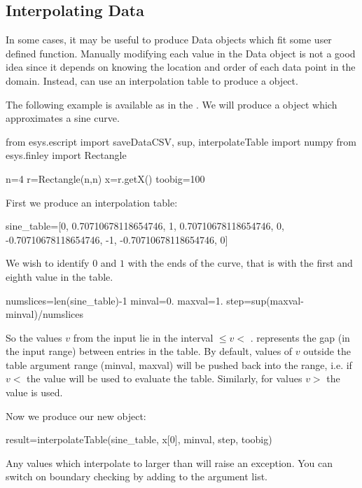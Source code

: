 \subsection{Interpolating Data}
\label{sec:interpolation}
In some cases, it may be useful to produce Data objects which fit some user
defined function.
Manually modifying each value in the Data object is not a good idea since it
depends on knowing the location and order of each data point in the domain.
Instead, \escript can use an interpolation table to produce a \Data object.

The following example is available as  in the \ExampleDirectory.
We will produce a \Data object which approximates a sine curve.

\begin{python}
  from esys.escript import saveDataCSV, sup, interpolateTable
  import numpy
  from esys.finley import Rectangle

  n=4
  r=Rectangle(n,n)
  x=r.getX()
  toobig=100	
\end{python}

\noindent First we produce an interpolation table:
\begin{python}
  sine_table=[0, 0.70710678118654746, 1, 0.70710678118654746, 0,
             -0.70710678118654746, -1, -0.70710678118654746, 0]
\end{python}
%
We wish to identify $0$ and $1$ with the ends of the curve, that is
with the first and eighth value in the table.

\begin{python}
  numslices=len(sine_table)-1
  minval=0.
  maxval=1.
  step=sup(maxval-minval)/numslices
\end{python}
%
So the values $v$ from the input lie in the interval
 $\leq v <$ .
 represents the gap (in the input range) between entries in the table.
By default, values of $v$ outside the table argument range (minval, maxval)
will be pushed back into the range, i.e. if $v <$  the value
 will be used to evaluate the table.
Similarly, for values $v>$  the value  is used.

Now we produce our new \Data object:

\begin{python}
  result=interpolateTable(sine_table, x[0], minval, step, toobig)
\end{python}
Any values which interpolate to larger than  will raise an
exception. You can switch on boundary checking by adding
 to the argument list.

